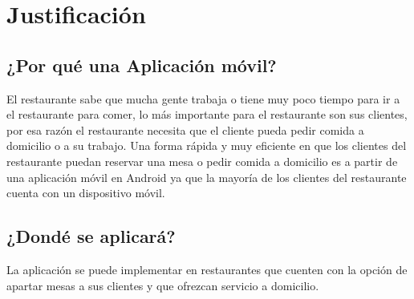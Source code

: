 \chapter{Justificaci\'on}

\section{¿Por qu\'e una Aplicaci\'on m\'ovil?}
El restaurante sabe que mucha gente trabaja o tiene muy poco tiempo para ir a el restaurante para comer, lo m\'as importante para el restaurante son sus clientes, por esa raz\'on el restaurante necesita que el cliente pueda pedir comida a domicilio o a su trabajo. Una forma rápida y muy eficiente en que los clientes del restaurante puedan reservar una mesa o pedir comida a domicilio es a partir de una aplicación móvil en Android ya que la mayoría de los clientes del restaurante cuenta con un dispositivo móvil.


\section{¿Dond\'e se aplicar\'a?}
La aplicación se puede implementar en restaurantes que cuenten con la opción de apartar mesas a sus clientes y que ofrezcan servicio a domicilio.








